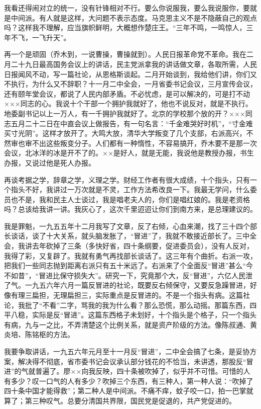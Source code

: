 我看还得闹对立的统一，没有针锋相对不行。要么你说服我，要么我说服你，要就是中间派。有人就是这样，大问题不表示态度。马克思主义不是不隐蔽自己的观点吗？这样我不理解，应当旗帜鲜明，大概想作楚庄王。“三年不鸣，一鸣惊人，三年不飞，一飞升天”。

再一个是顽固（乔木到，一说曹操，曹操就到）。人民日报革命党不革命。我在二月二十九日最高国务会议上的讲话，民主党派拿我的讲话做文章，各取所需，人民日报闻风不动，写一篇社论，从恩格斯谈起。二月开始谈到，我给他们讲，你们又不执行，为什么又不辞职？十一月二中全会，一月省委书记会议，三月宣传会议，还有颐年堂会议，都说了人民内部矛盾。不必忧虑，是可以解决的，可是打不动×××同志的心。我说十个干部一个拥护我就好了，他也不说反对，就是不执行。地委副书记以上一万人，有一千拥护我就好了。北京的学校那个放的开？×××同志五月二十二日在中直会议上做报告，有一句名言：“千金难哭好时机”，“寸金难买寸光阴”。这样才放开了。大鸣大放，清华大学叛变了几个支部，右派高兴，不然审也审不出这些叛变分子。人们都有一种惰性，不容易搞开，乔木要不是那一次会议，北冰洋的冰是开不了的。××是好人，就是无能，我说他是教授办报，书生办报，又说过他是死人办报。

再谈考据之学，辞章之学，义理之学。财经工作者有很大成绩，十个指头，只有一个指头不好，我讲过一万次就是不灵，工作方法希改良一下。我最无学问，什么委员也不是，我和民主人士谈过，我是唱老夫人的，你们是唱红娘的。我是老资格吗？总该给我讲一讲。我灰心了，这次千里迢迢让你们到南方来，是总理建议的。

我是罪魁，一九五五年十二月我写了文章，反了右倾，心血来潮，找了三十四个部长谈话，谈了十大关系，就头脑发胀了，“冒进”了，我就不敢接近部长了。三中全会，我讲去年砍掉了三条（多快好省，四十条纲要，促进委员会），没有人反对，我得了彩，又复辟了。我就有勇气再找部长谈话了。这三年有个曲折。右派一攻，把我们一些同志抛到距离右派只有五十米远了。右派来了个全面反“冒进”甚么“今不如昔”，“冒进比保守损失大”。研究一下，究竟那个大，反“冒进”，六亿人民泄了气。一九五六年六月一篇反冒进的社论，既要反右倾保守，又要反急躁冒进，好像有理三扁担，无理扁担三，实际重点是反冒进的。不是一个指头有病。这篇社论，我批了“不看”二字，骂我的我为什么看？那么恐慌，那么动摇。那篇东西，四平八稳，实际是反“冒进”。这篇东西格子未划好，十个指头是个格子，只一个指头有病，九与一之比，不弄清楚这个比例关系，就是资产阶级的方法。像陈叔通、黄炎培、陈铭枢的方法。

我要争取讲话，一九五六年元月至十一月反“冒进”，二中全会搞了七条，是妥协方案，解决得不彻底，省市委书记会议承认部分钱花的不恰当，未讲透，那股反“冒进”的气就普遍了。廖××向我反映，四十条被吹掉了，似乎并不可惜。可惜的人有多少？叹一口气的人有多少？吹掉三个东西，有三种人，第一种人说：“吹掉了四十条中国才能得救”；第二种人是中间派。不痛不痒，蚊子咬一口，拍一巴掌就算了；第三种叹气。总要分清国共界限，国民党是促退的，共产党促进的。


